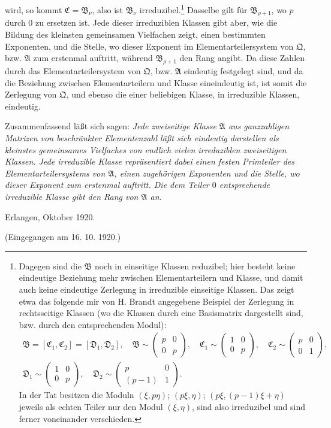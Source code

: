 \documentclass[11pt]{article}
\begin{document}
wird, so kommt $\mathfrak C=\mathfrak B_\nu$, also ist $\mathfrak B_\nu$ irreduzibel.\footnote{Dagegen sind die $\mathfrak B$ noch in einseitige Klassen reduzibel; hier besteht keine eindeutige Beziehung mehr zwischen Elementarteilern und Klasse, und damit auch keine eindeutige Zerlegung in irreduzible einseitige Klassen. Das zeigt etwa das folgende mir von H. Brandt angegebene Beispiel der Zerlegung in rechtsseitige Klassen (wo die Klassen durch eine Basismatrix dargestellt sind, bzw. durch den entsprechenden Modul):
\[
\begin{gathered}
 \mathfrak B=[\mathfrak C_1,\mathfrak C_2]=[\mathfrak D_1,\mathfrak D_2],\quad
 \mathfrak B\sim\begin{pmatrix}p&0\\0&p\end{pmatrix},\quad
 \mathfrak C_1\sim\begin{pmatrix}1&0\\0&p\end{pmatrix},\quad
 \mathfrak C_2\sim\begin{pmatrix}p&0\\0&1\end{pmatrix},\\
 \mathfrak D_1\sim\begin{pmatrix}1&0\\0&p\end{pmatrix},
 \quad
 \mathfrak D_2\sim\begin{pmatrix}p&0\\(p-1)&1\end{pmatrix}.
\end{gathered}
\]
In der Tat besitzen die Moduln $(\xi,p\eta)$; $(p\xi,\eta)$; $(p\xi,(p-1)\xi+\eta)$ jeweils als echten Teiler nur den Modul $(\xi,\eta)$, sind also irreduzibel und sind ferner voneinander verschieden.} Dasselbe gilt für $\mathfrak B_{\rho+1}$, wo $p$ durch $0$ zu ersetzen ist. Jede dieser irreduziblen Klassen gibt aber, wie die Bildung des kleinsten gemeinsamen Vielfachen zeigt, einen bestimmten Exponenten, und die Stelle, wo dieser Exponent im Elementarteilersystem von $\mathfrak Q$, bzw. $\mathfrak A$ zum erstenmal auftritt, während $\mathfrak B_{\rho+1}$ den Rang angibt. Da diese Zahlen durch das Elementarteilersystem von $\mathfrak Q$, bzw. $\mathfrak A$ eindeutig festgelegt sind, und da die Beziehung zwischen Elementarteilern und Klasse eineindeutig ist, ist somit die Zerlegung von $\mathfrak Q$, und ebenso die einer beliebigen Klasse, in irreduzible Klassen, eindeutig.

Zusammenfassend läßt sich sagen: \emph{Jede zweiseitige Klasse $\mathfrak A$ aus ganzzahligen Matrizen von beschränkter Elementenzahl läßt sich eindeutig darstellen als kleinstes gemeinsames Vielfaches von endlich vielen irreduziblen zweiseitigen Klassen. Jede irreduzible Klasse repräsentiert dabei einen festen Primteiler des Elementarteilersystems von $\mathfrak A$, einen zugehörigen Exponenten und die Stelle, wo dieser Exponent zum erstenmal auftritt. Die dem Teiler $0$ entsprechende irreduzible Klasse gibt den Rang von $\mathfrak A$ an.}

\begin{flushleft}
Erlangen, Oktober 1920.
\end{flushleft}
\begin{center}
(Eingegangen am 16. 10. 1920.)
\end{center}
\end{document}
